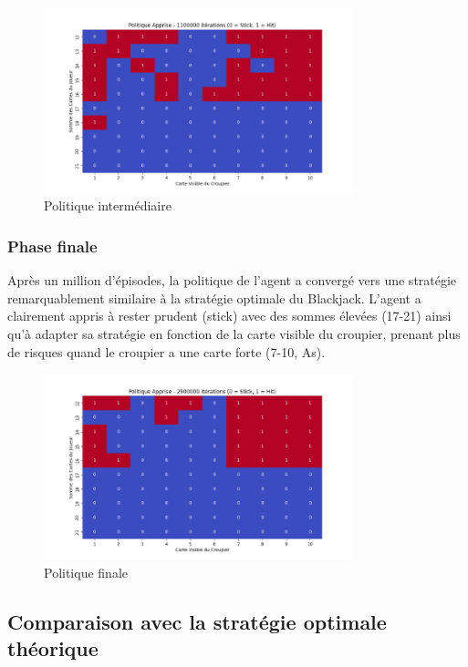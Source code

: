 \documentclass{article}
\begin{document}
    \begin{figure}[ht]
        \centering
        \includegraphics[width=0.8\textwidth]{2.png}
        \caption{Politique intermédiaire}
    \end{figure}

    \subsubsection{Phase finale}
    
    \quad Après un million d'épisodes, la politique de l'agent a convergé vers une stratégie remarquablement similaire à la stratégie optimale du Blackjack. L'agent a clairement appris à rester prudent (stick) avec des sommes élevées (17-21) ainsi qu'à adapter sa stratégie en fonction de la carte visible du croupier, prenant plus de risques quand le croupier a une carte forte (7-10, As).
    
    \begin{figure}[ht]
        \centering
        \includegraphics[width=0.8\textwidth]{3.png}
        \caption{Politique finale}
    \end{figure}

\subsection{Comparaison avec la stratégie optimale théorique}
\end{document}
